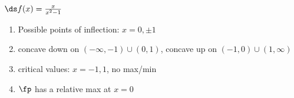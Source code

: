 {$\ds f(x) = \frac{x}{x^2-1}$
}
{\begin{enumerate}[label=(\alph*)]
\item Possible points of inflection: $x=0,\pm 1$
\item concave down on $(-\infty,-1)\cup (0,1)$,
concave up on $(-1,0) \cup (1,\infty)$
\item critical values: $x=-1,1$, no max/min
\item $\fp$ has a relative max at $x=0$
\end{enumerate}}
